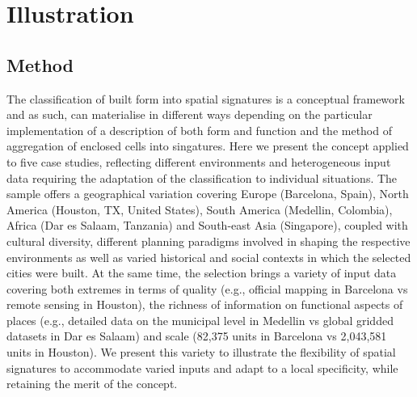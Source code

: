 \section{Illustration}
\label{sec:app}



\subsection{Method}

The classification of built form into spatial signatures is a conceptual
framework and as such, can
materialise in different ways depending on the particular implementation of a
description of both form and function and the method of aggregation of
enclosed cells into singatures.
Here we present the concept applied to five case studies, reflecting different
environments and heterogeneous input data requiring the
adaptation of the classification to individual situations.
The sample offers a geographical variation covering Europe (Barcelona, Spain),
North America (Houston, TX, United States), South America (Medellin, Colombia),
Africa (Dar es Salaam, Tanzania) and South-east Asia (Singapore),
coupled with cultural diversity, different planning paradigms involved in
shaping the respective environments as well as varied historical and social
contexts in which the selected cities were built.
At the same time, the selection brings a variety of input data covering both
extremes in terms of quality (e.g., official mapping in Barcelona vs remote
sensing in Houston), the richness of information on functional aspects of places
(e.g., detailed data on the municipal level in Medellin vs global gridded
datasets in Dar es Salaam) and scale (82,375 units in Barcelona vs 2,043,581 units in
Houston).
We present this variety to illustrate the flexibility of spatial signatures to
accommodate varied inputs and adapt to a local specificity, while retaining the
merit of the concept.

